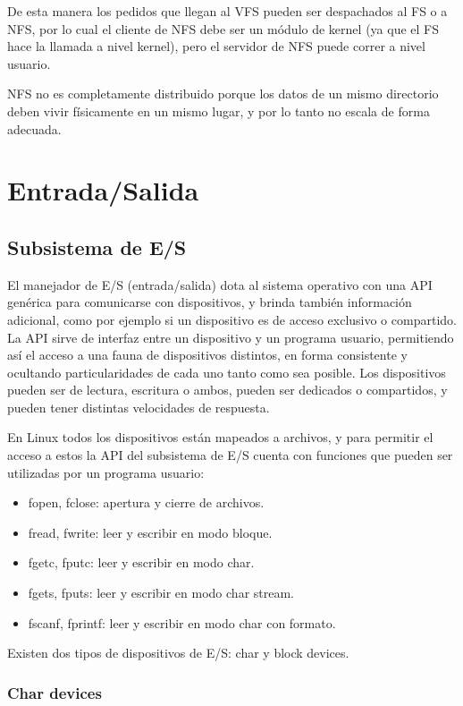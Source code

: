 \documentclass{article}
\begin{document}
De esta manera los pedidos que llegan al VFS pueden ser despachados al FS o a NFS, por lo cual el cliente de NFS debe ser un módulo de kernel (ya que el FS hace la llamada a nivel kernel), pero el servidor de NFS puede correr a nivel usuario.

NFS no es completamente distribuido porque los datos de un mismo directorio deben vivir físicamente en un mismo lugar, y por lo tanto no escala de forma adecuada.

\section{Entrada/Salida}

\subsection{Subsistema de E/S}

El manejador de E/S (entrada/salida) dota al sistema operativo con una API genérica para comunicarse con dispositivos, y brinda también información adicional, como por ejemplo si un dispositivo es de acceso exclusivo o compartido. La API sirve de interfaz entre un dispositivo y un programa usuario, permitiendo así el acceso a una fauna de dispositivos distintos, en forma consistente y ocultando particularidades de cada uno tanto como sea posible. Los dispositivos pueden ser de lectura, escritura o ambos, pueden ser dedicados o compartidos, y pueden tener distintas velocidades de respuesta.

En Linux todos los dispositivos están mapeados a archivos, y para permitir el acceso a estos la API del subsistema de E/S cuenta con funciones que pueden ser utilizadas por un programa usuario: 

\begin{itemize}
 \item fopen, fclose: apertura y cierre de archivos.
 \item fread, fwrite: leer y escribir en modo bloque.
 \item fgetc, fputc: leer y escribir en modo char.
 \item fgets, fputs: leer y escribir en modo char stream.
 \item fscanf, fprintf: leer y escribir en modo char con formato.
\end{itemize}


Existen dos tipos de dispositivos de E/S: char y block devices.

\subsubsection{Char devices}
\end{document}
